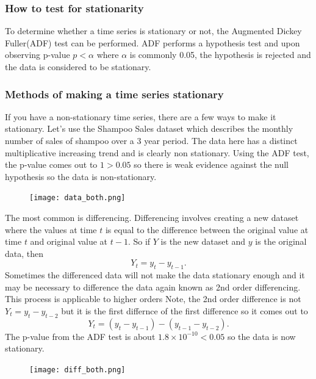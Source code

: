 \documentclass{article}
\begin{document}
  \subsubsection{How to test for stationarity}
    To determine whether a time series is stationary or not, the Augmented Dickey Fuller(ADF) test can be performed. ADF performs a hypothesis test and upon observing p-value $p < \alpha$ where $\alpha$ is commonly 0.05, the hypothesis is rejected and the data is considered to be stationary.

  \subsubsection{Methods of making a time series stationary}
    If you have a non-stationary time series, there are a few ways to make it stationary. Let's use the Shampoo Sales dataset which describes the monthly number of sales of shampoo over a 3 year period.
    The data here has a distinct multiplicative increasing trend and is clearly non stationary. Using the ADF test, the p-value comes out to $1>0.05$ so there is weak evidence against the null hypothesis so the data is non-stationary.
    \begin{figure}[H]
      \texttt{[image: data\_both.png]}
      \caption{}
    \end{figure}
    The most common is differencing. Differencing involves creating a new dataset where the values at time $t$ is equal to the difference between the original value at time $t$ and original value at $t-1$. So if $Y$ is the new dataset and $y$ is the original data, then
    \begin{equation*}
      Y_t = y_t - y_{t-1}.
    \end{equation*}
    Sometimes the differenced data will not make the data stationary enough and it may be necessary to difference the data again known as 2nd order differencing. This process is applicable to higher orders
    Note, the 2nd order difference is not $Y_t = y_t - y_{t-2}$ but it is the first differnce of the first difference so it comes out to
    \begin{equation*}
      Y_t = (y_t - y_{t-1}) - (y_{t-1} - y_{t-2}).
    \end{equation*}
    The p-value from the ADF test is about $1.8 \times 10^{-10} < 0.05$ so the data is now stationary.
    \begin{figure}[H]
      \centering
      \texttt{[image: diff\_both.png]}
      \caption{}
    \end{figure}
\end{document}
